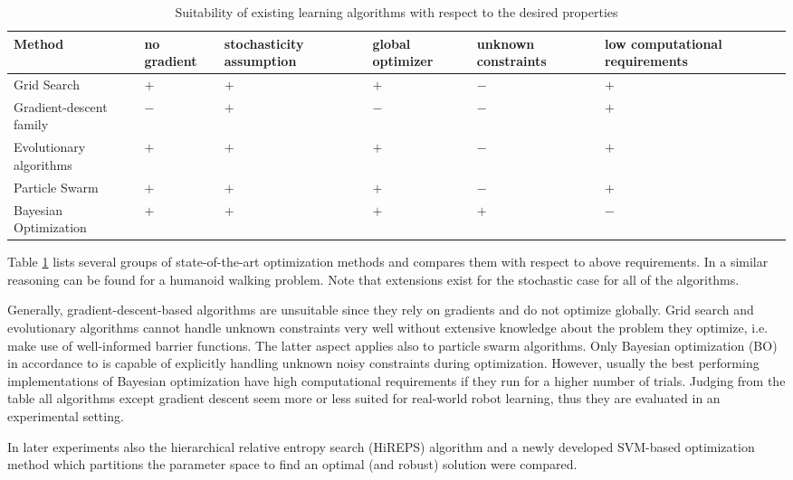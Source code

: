 \begin{table}[h!]
\caption{Suitability of existing learning algorithms with respect to the desired properties}
\label{tab:foundations:learning:algorithms:comparison}
\begin{tabular}{|p{2.4cm}|p{1.8cm}|p{2.2cm}|p{1.7cm}|p{2cm}|p{3.3cm}|}
\hline 
Method & no \nohyphens{gradient} & stochasticity assumption & global optimizer & unknown constraints & low computational requirements \\ 
\hline 
Grid Search & $+$ & $+$ & $+$ & $-$ &$+$ \\ 
\hline 
Gradient-descent family & $-$ & $+$ & $-$ & $-$ & $+$\\ 
\hline 
Evolutionary algorithms & $+$ & $+$ & $+$ & $-$ & $+$\\ 
\hline 
Particle Swarm & $+$ & $+$ & $+$ & $-$ & $+$\\ 
\hline 
Bayesian Optimization & $+$ & $+$ & $+$ & $+$ & $-$ \\ 
\hline 
\end{tabular}
\end{table} 

Table \ref{tab:foundations:learning:algorithms:comparison} lists several groups of state-of-the-art optimization methods and compares them with respect to above requirements.
In \cite{Calandra.2014} a similar reasoning can be found for a humanoid walking problem.
Note that extensions exist for the stochastic case for all of the algorithms.

Generally, gradient-descent-based algorithms are unsuitable since they rely on gradients and do not optimize globally.
Grid search and evolutionary algorithms cannot handle unknown constraints very well without extensive knowledge about the problem they optimize, i.e. make use of well-informed barrier functions.
The latter aspect applies also to particle swarm algorithms.
Only Bayesian optimization (BO) in accordance to \cite{Snoek.2013} is capable of explicitly handling unknown noisy constraints during optimization.
However, usually the best performing implementations of Bayesian optimization have high computational requirements if they run for a higher number of trials.
Judging from the table all algorithms except gradient descent seem more or less suited for real-world robot learning, thus they are evaluated in an experimental setting.

In later experiments also the hierarchical relative entropy search (HiREPS) algorithm and a newly developed SVM-based optimization method which partitions the parameter space to find an optimal (and robust) solution were compared.


